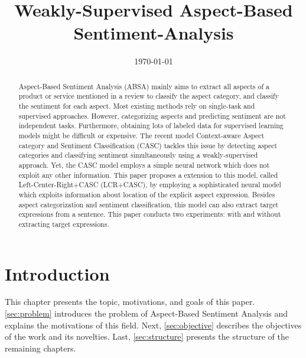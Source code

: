 \documentclass[american, oneside]{ecsgdp}
\begin{document}
\newcommand{\modelname}{MODELNAME }

\frontmatter
\title{Weakly-Supervised Aspect-Based Sentiment-Analysis}
\addresses{\groupname\\\deptname\\\univname}
\date{\today}

% 

\maketitle

\begin{abstract}
    Aspect-Based Sentiment Analysis (ABSA) mainly aims to extract all aspects of a product or service mentioned in a review to classify the aspect category, and classify the sentiment for each aspect. Most existing methods rely on single-task and supervised approaches. However, categorizing aspects and predicting sentiment are not independent tasks. Furthermore, obtaining lots of labeled data for supervised learning models might be difficult or expensive. The recent model Context-aware Aspect category and Sentiment Classification (CASC) \textcite{Kumar2021CASC} tackles this issue by detecting aspect categories and classifying sentiment simultaneously using a weakly-supervised approach. Yet, the CASC model employs a simple neural network which does not exploit any other information. This paper proposes a extension to this model, called Left-Center-Right+CASC (LCR+CASC), by employing a sophisticated neural model which exploits information about location of the explicit aspect expression. Besides aspect categorization and sentiment classification, this model can also extract target expressions from a sentence. This paper conducts two experiments: with and without extracting target expressions.
\end{abstract}

\tableofcontents

\mainmatter
\chapter{Introduction} \label{chap:introduction}
This chapter presents the topic, motivations, and goals of this paper. \cref{sec:problem} introduces the problem of Aspect-Based Sentiment Analysis and explains the motivations of this field. Next, \cref{sec:objective} describes the objectives of the work and its novelties. Last, \cref{sec:structure} presents the structure of the remaining chapters. %
\end{document}
